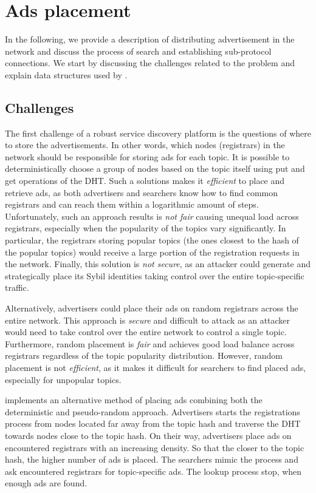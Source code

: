 
\section{Ads placement}
\label{sec:placement}
In the following, we provide a description of distributing advertisement in the network and discuss the process of search and establishing sub-protocol connections. We start by discussing the challenges related to the problem and explain data structures used by \sysname. 

\subsection{Challenges}
The first challenge of a robust service discovery platform is the questions of where to store the advertisements. In other words, which nodes (registrars) in the network should be responsible for storing ads for each topic. It is possible to deterministically choose a group of nodes based on the topic itself using put and get operations of the DHT. Such a solutions makes it \emph{efficient} to place and retrieve ads, as both advertisers and searchers know how to find common registrars and can reach them within a logarithmic amount of steps. Unfortunately, such an approach results is \emph{not fair} causing unequal load across registrars, especially when the popularity of the topics vary significantly. In particular, the registrars storing popular topics (\ie the ones closest to the hash of the popular topics) would receive a large portion of the registration requests in the network. Finally, this solution is \emph{not secure}, as an attacker could generate and strategically place its Sybil identities taking control over the entire topic-specific traffic. 

Alternatively, advertisers could place their ads on random registrars across the entire network. This approach is \emph{secure} and difficult to attack as an attacker would need to take control over the entire network to control a single topic. Furthermore, random placement is \emph{fair} and achieves good load balance across registrars regardless of the topic popularity distribution. However, random placement is not \emph{efficient}, as it makes it difficult for searchers to find placed ads, especially for unpopular topics. 

\sysname implements an alternative method of placing ads combining both the deterministic and pseudo-random approach. Advertisers starts the registrations process from nodes located far away from the topic hash and traverse the DHT towards nodes close to the topic hash. On their way, advertisers place ads on encountered registrars with an increasing density. So that the closer to the topic hash, the higher number of ads is placed. The searchers mimic the process and ask encountered registrars for topic-specific ads. The lookup process stop, when enough ads are found.

